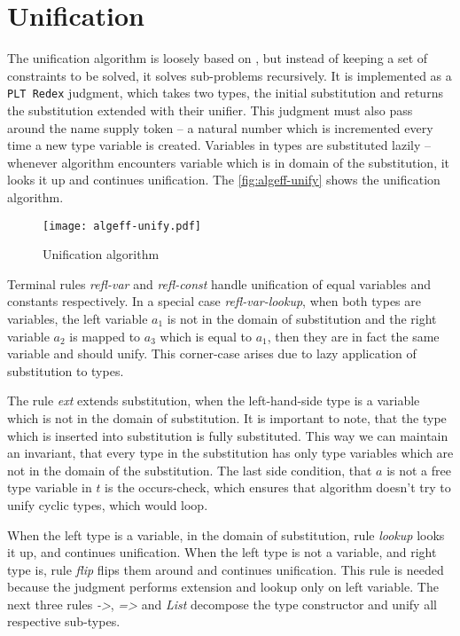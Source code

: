 \documentclass[inz, english, shortabstract]{iithesis}
\newcommand{\Redex}{\texttt{PLT Redex}}
\begin{document}
\section{Unification}\label{sec:unification}
The unification algorithm is loosely based on \cite{Pierce2002}, but instead of keeping a set of constraints to be solved, it solves sub-problems recursively.
It is implemented as a \Redex{} judgment, which takes two types, the initial substitution and returns the substitution extended with their unifier.
This judgment must also pass around the name supply token -- a natural number which is incremented every time a new type variable is created.
Variables in types are substituted lazily -- whenever algorithm encounters variable which is in domain of the substitution, it looks it up and continues unification.
The \autoref{fig:algeff-unify} shows the unification algorithm.

\begin{figure}[h]
  \centering
  \texttt{[image: algeff-unify.pdf]}
  \caption{Unification algorithm}
  \label{fig:algeff-unify}
\end{figure}

Terminal rules \emph{refl-var} and \emph{refl-const} handle unification of equal variables and constants respectively.
In a special case \emph{refl-var-lookup}, when both types are variables, the left variable $a_1$ is not in the domain of substitution and the right variable $a_2$ is mapped to $a_3$ which is equal to $a_1$, then they are in fact the same variable and should unify.
This corner-case arises due to lazy application of substitution to types.

The rule \emph{ext} extends substitution, when the left-hand-side type is a variable which is not in the domain of substitution.
It is important to note, that the type which is inserted into substitution is fully substituted.
This way we can maintain an invariant, that every type in the substitution has only type variables which are not in the domain of the substitution.
The last side condition, that $a$ is not a free type variable in $t$ is the occurs-check, which ensures that algorithm doesn't try to unify cyclic types, which would loop.

When the left type is a variable, in the domain of substitution, rule \emph{lookup} looks it up, and continues unification.
When the left type is not a variable, and right type is, rule \emph{flip} flips them around and continues unification.
This rule is needed because the judgment performs extension and lookup only on left variable.
The next three rules \emph{->}, \emph{=>} and \emph{List} decompose the type constructor and unify all respective sub-types.
\end{document}
